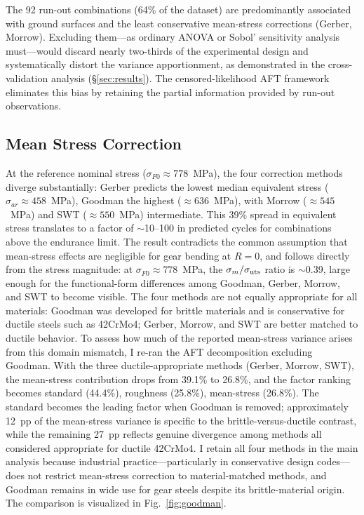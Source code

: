\documentclass[12pt,a4paper]{article}
\begin{document}
The 92 run-out combinations (64\% of the dataset) are predominantly
associated with ground surfaces and the least conservative
mean-stress corrections (Gerber, Morrow). Excluding them---as ordinary
ANOVA or Sobol' sensitivity analysis must---would discard nearly
two-thirds of the experimental design and systematically distort the
variance apportionment, as demonstrated in the cross-validation
analysis (\S\ref{sec:results}). The censored-likelihood AFT
framework eliminates this bias by retaining the partial information
provided by run-out observations.

\subsection{Mean Stress Correction}

At the reference nominal stress ($\sigma_{F0} \approx 778$~MPa), the
four correction methods diverge substantially: Gerber predicts the
lowest median equivalent stress ($\sigma_{ar} \approx 458$~MPa),
Goodman the highest ($\approx 636$~MPa), with Morrow ($\approx 545$~MPa)
and SWT ($\approx 550$~MPa) intermediate. This 39\% spread in
equivalent stress translates to a factor of $\sim$10--100 in predicted
cycles for combinations above the endurance limit. The result contradicts
the common assumption that mean-stress effects are negligible for gear
bending at $R=0$, and follows directly from the stress magnitude: at
$\sigma_{F0} \approx 778$~MPa, the $\sigma_m/\sigma_{\rm uts}$ ratio
is $\sim$0.39, large enough for the functional-form differences among
Goodman, Gerber, Morrow, and SWT to become visible.
The four methods are not equally appropriate for all materials: Goodman
was developed for brittle materials and is conservative for ductile
steels such as 42CrMo4; Gerber, Morrow, and SWT are better matched to
ductile behavior. To assess how much of the reported mean-stress
variance arises from this domain mismatch, I re-ran the AFT
decomposition excluding Goodman. With the three ductile-appropriate
methods (Gerber, Morrow, SWT), the mean-stress contribution drops from
39.1\% to 26.8\%, and the factor ranking becomes standard (44.4\%),
roughness (25.8\%), mean-stress (26.8\%). The standard becomes the
leading factor when Goodman is removed; approximately 12~pp of the
mean-stress variance is specific to the brittle-versus-ductile
contrast, while the remaining 27~pp reflects genuine divergence
among methods all considered appropriate for ductile 42CrMo4. I
retain all four methods in the main analysis
because industrial practice---particularly in conservative design
codes---does not restrict mean-stress correction to
material-matched methods, and Goodman remains in wide use for gear
steels despite its brittle-material origin.
The comparison is visualized in Fig.~\ref{fig:goodman}.
\end{document}
